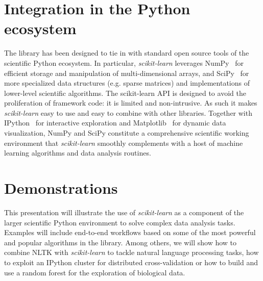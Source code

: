 \documentclass{article}
\newcommand{\sklearn}{\textit{scikit-learn}\xspace}
\DeclareRobustCommand{\VAN}[3]{#2}
\begin{document}
\section*{Integration in the Python ecosystem}

The library has been designed to tie in with standard  open source tools of the
scientific Python ecosystem. In particular, \sklearn leverages
NumPy~\citep{vanderwalt2011} for efficient storage and manipulation of
multi-dimensional arrays, and SciPy~\citep{oliphant2007python} for more specialized
data structures  (e.g. sparse matrices) and implementations of lower-level
scientific algorithms. The scikit-learn API is designed to avoid the
proliferation of framework code: it is
limited and non-intrusive. As such it makes \sklearn easy to use and easy to
combine with other libraries. Together with IPython~\citep{perez2007ipython}
for interactive exploration and Matplotlib~\citep{hunter2007matplotlib} for
dynamic data visualization, NumPy and SciPy constitute a comprehensive
scientific working environment that \sklearn smoothly complements with a
host of machine learning algorithms and data analysis routines.


\section*{Demonstrations}

This presentation will illustrate the use of \sklearn as a component of the
larger scientific Python environment to solve complex data analysis tasks.
Examples will include end-to-end workflows based on some of the most powerful
and popular algorithms in the library. Among others, we will show how to
combine NLTK with \sklearn to tackle natural language processing tasks, how to
exploit an IPython cluster for distributed cross-validation or how to build and
use a random forest for the exploration of biological data.


{\scriptsize

\DeclareRobustCommand{\VAN}[3]{#3}
\setlength{\bibsep}{1mm}

}
\end{document}
